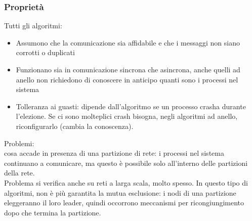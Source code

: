\documentclass[16px]{article}
\begin{document}
\subsubsection{Proprietà}
Tutti gli algoritmi:
\begin{itemize}
\item Assumono che la comunicazione sia affidabile e che i messaggi non siano corrotti o duplicati
\item Funzionano sia in comunicazione sincrona che asincrona, anche quelli ad anello non richiedono di conoscere in anticipo quanti sono i processi nel sistema
\item Tolleranza ai guasti: dipende dall'algoritmo se un processo crasha durante l'elezione. Se ci sono molteplici crash bisogna, negli algoritmi ad anello, riconfigurarlo (cambia la conoscenza).
\end{itemize}
Problemi:\\ cosa accade in presenza di una partizione di rete: i processi nel sistema continuano a comunicare, ma questo è possibile solo all'interno delle partizioni della rete.\\ Problema si verifica anche su reti a larga scala, molto spesso. In questo tipo di algoritmi, non è più garantita la mutua esclusione: i nodi di una partizione eleggeranno il loro leader, quindi occorrono meccanismi per ricongiungimento dopo che termina la partizione.
\end{document}

